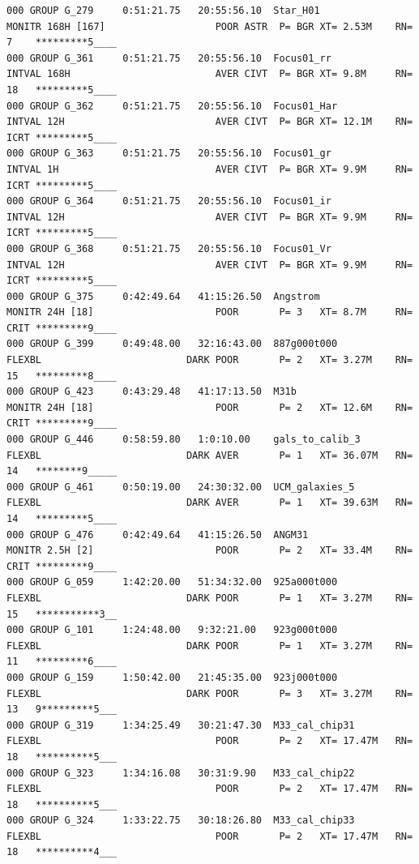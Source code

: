 \begin{landscape}
\tiny
\begin{verbatim}
000 GROUP G_279     0:51:21.75   20:55:56.10  Star_H01            MONITR 168H [167]                   POOR ASTR  P= BGR XT= 2.53M    RN= 7    *********5____
000 GROUP G_361     0:51:21.75   20:55:56.10  Focus01_rr          INTVAL 168H                         AVER CIVT  P= BGR XT= 9.8M     RN= 18   *********5____
000 GROUP G_362     0:51:21.75   20:55:56.10  Focus01_Har         INTVAL 12H                          AVER CIVT  P= BGR XT= 12.1M    RN= ICRT *********5____
000 GROUP G_363     0:51:21.75   20:55:56.10  Focus01_gr          INTVAL 1H                           AVER CIVT  P= BGR XT= 9.9M     RN= ICRT *********5____
000 GROUP G_364     0:51:21.75   20:55:56.10  Focus01_ir          INTVAL 12H                          AVER CIVT  P= BGR XT= 9.9M     RN= ICRT *********5____
000 GROUP G_368     0:51:21.75   20:55:56.10  Focus01_Vr          INTVAL 12H                          AVER CIVT  P= BGR XT= 9.9M     RN= ICRT *********5____
000 GROUP G_375     0:42:49.64   41:15:26.50  Angstrom            MONITR 24H [18]                     POOR       P= 3   XT= 8.7M     RN= CRIT *********9____
000 GROUP G_399     0:49:48.00   32:16:43.00  887g000t000         FLEXBL                         DARK POOR       P= 2   XT= 3.27M    RN= 15   *********8____
000 GROUP G_423     0:43:29.48   41:17:13.50  M31b                MONITR 24H [18]                     POOR       P= 2   XT= 12.6M    RN= CRIT *********9____
000 GROUP G_446     0:58:59.80   1:0:10.00    gals_to_calib_3     FLEXBL                         DARK AVER       P= 1   XT= 36.07M   RN= 14   ********9_____
000 GROUP G_461     0:50:19.00   24:30:32.00  UCM_galaxies_5      FLEXBL                         DARK AVER       P= 1   XT= 39.63M   RN= 14   *********5____
000 GROUP G_476     0:42:49.64   41:15:26.50  ANGM31              MONITR 2.5H [2]                     POOR       P= 2   XT= 33.4M    RN= CRIT *********9____
000 GROUP G_059     1:42:20.00   51:34:32.00  925a000t000         FLEXBL                         DARK POOR       P= 1   XT= 3.27M    RN= 15   ***********3__
000 GROUP G_101     1:24:48.00   9:32:21.00   923g000t000         FLEXBL                         DARK POOR       P= 1   XT= 3.27M    RN= 11   *********6____
000 GROUP G_159     1:50:42.00   21:45:35.00  923j000t000         FLEXBL                         DARK POOR       P= 3   XT= 3.27M    RN= 13   9*********5___
000 GROUP G_319     1:34:25.49   30:21:47.30  M33_cal_chip31      FLEXBL                              POOR       P= 2   XT= 17.47M   RN= 18   **********5___
000 GROUP G_323     1:34:16.08   30:31:9.90   M33_cal_chip22      FLEXBL                              POOR       P= 2   XT= 17.47M   RN= 18   **********5___
000 GROUP G_324     1:33:22.75   30:18:26.80  M33_cal_chip33      FLEXBL                              POOR       P= 2   XT= 17.47M   RN= 18   **********4___
\end{verbatim}
\end{landscape}
\normalsize




